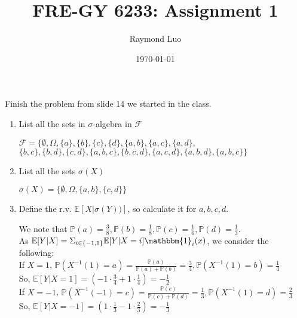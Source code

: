 \documentclass[12pt,twoside, letter]{exam}
\theoremstyle{definition}
\newcommand{\ee}{\mathbb{E}}
\newcommand{\pp}{\mathbb{P}}
\newcommand{\id}{\mathbbm{1}}
\begin{document}
\abovedisplayskip=12pt
\belowdisplayskip=12pt
\abovedisplayshortskip=7pt
\belowdisplayshortskip=10pt
\allowdisplaybreaks

\setlength{\parindent}{18pt}

\title{FRE-GY 6233: Assignment 1}
\author{Raymond Luo}
\date{\today}
\maketitle

Finish the problem from slide 14 we started in the class.
\begin{enumerate}
  \item List all the sets in $\sigma$-algebra in $\mathcal{F}$
    \begin{solution}
      $\mathcal{F} = \{\emptyset, \Omega, \{a\}, \{b\}, \{c\}, \{d\}, \{a,b\}, \{a,c\}, \{a,d\},$\\
      $\{b,c\}, \{b,d\}, \{c,d\}, \{a,b,c\}, \{b,c,d\}, \{a,c,d\}, \{a,b,d\}, \{a,b,c\} \}$
    \end{solution}
  \item List all the sets $\sigma(X)$
    \begin{solution}
      $\sigma(X) = \{\emptyset, \Omega, \{a,b\}, \{c,d\}\}$
    \end{solution}
  \item Define the r.v. $\ee[X|\sigma(Y))]$, so calculate it for $a,b,c,d$.
    \begin{solution}
      We note that $\pp(a) = \frac{3}{8}, \pp(b) = \frac{1}{8}, \pp(c) = \frac{1}{6}, \pp(d) = \frac{1}{3}$. \\
      As $\ee[Y|X] = \Sigma_{i \in \{-1,1\}} \ee[Y|X = i]\id_{i}(x)$, we consider the following: \\
      If $X = 1$, $\pp(X^{-1}(1) = a) = \frac{\pp(a)}{\pp(a) + \pp(b)} = \frac{3}{4}, \pp(X^{-1}(1) = b) = \frac{1}{4}$\\
      So, $\ee[Y|X = 1] = (-1 \cdot \frac{3}{4} + 1 \cdot \frac{1}{4})
      = -\frac{1}{2}$ \\
      If $X = -1$, $\pp(X^{-1}(-1) = c) = \frac{\pp(c)}{\pp(c) + \pp(d)} = \frac{1}{3}, \pp(X^{-1}(1) = d) = \frac{2}{3}$\\
      So, $\ee[Y|X = -1] = (1 \cdot \frac{1}{3} - 1 \cdot \frac{2}{3})
      = -\frac{1}{3}$
    \end{solution}
\end{enumerate}
\end{document}
